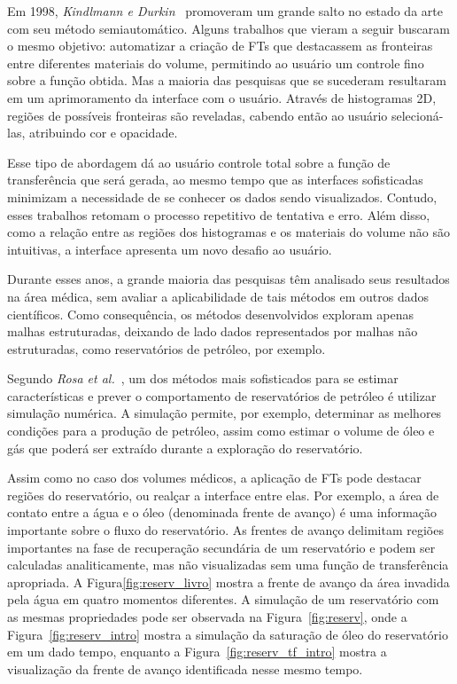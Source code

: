     Em 1998, \textit{Kindlmann e Durkin}~\cite{gordon} promoveram um grande salto no estado da arte com seu método semiautomático. Alguns trabalhos que vieram a seguir buscaram o mesmo objetivo: automatizar a criação de FTs que destacassem as fronteiras entre diferentes materiais do volume, permitindo ao usuário um controle fino sobre a função obtida. Mas a maioria das pesquisas que se sucederam resultaram em um aprimoramento da interface com o usuário. Através de histogramas 2D, regiões de possíveis fronteiras são reveladas, cabendo então ao usuário selecioná-las, atribuindo cor e opacidade.
    
    Esse tipo de abordagem dá ao usuário controle total sobre a função de transferência que será gerada, ao mesmo tempo que as interfaces sofisticadas minimizam a necessidade de se conhecer os dados sendo visualizados. Contudo, esses trabalhos retomam o processo repetitivo de tentativa e erro. Além disso, como a relação entre as regiões dos histogramas e os materiais do volume não são intuitivas, a interface apresenta um novo desafio ao usuário.
    
    Durante esses anos, a grande maioria das pesquisas têm analisado seus resultados na área médica, sem avaliar a aplicabilidade de tais métodos em outros dados científicos. Como consequência, os métodos desenvolvidos exploram apenas malhas estruturadas, deixando de lado dados representados por malhas não estruturadas, como reservatórios de petróleo, por exemplo.
    
    Segundo \textit{Rosa et al.}~\cite{rosa}, um dos métodos mais sofisticados para se estimar características e prever o comportamento de reservatórios de petróleo é utilizar simulação numérica. A simulação permite, por exemplo, determinar as melhores condições para a produção de petróleo, assim como estimar o volume de óleo e gás que poderá ser extraído durante a exploração do reservatório.
    
    Assim como no caso dos volumes médicos, a aplicação de FTs pode destacar regiões do reservatório, ou realçar a interface entre elas. Por exemplo, a área de contato entre a água e o óleo (denominada frente de avanço) é uma informação importante sobre o fluxo do reservatório. As frentes de avanço delimitam regiões importantes na fase de recuperação secundária de um reservatório e podem ser calculadas analiticamente, mas não visualizadas sem uma função de transferência apropriada. A Figura\ref{fig:reserv_livro} mostra a frente de avanço da área invadida pela água em quatro momentos diferentes. A simulação de um reservatório com as mesmas propriedades pode ser observada na Figura~\ref{fig:reserv}, onde a Figura~\ref{fig:reserv_intro} mostra a simulação da saturação de óleo do reservatório em um dado tempo, enquanto a Figura~\ref{fig:reserv_tf_intro} mostra a visualização da frente de avanço identificada nesse mesmo tempo.
    

